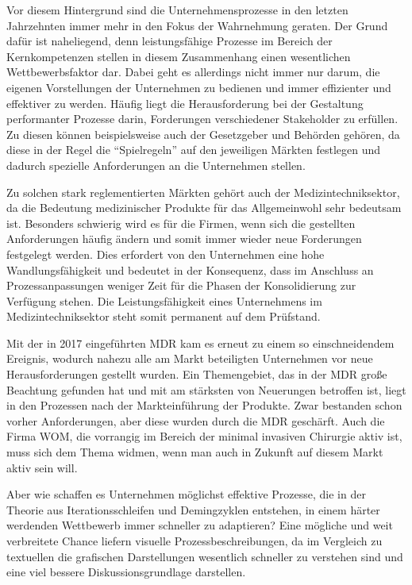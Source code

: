 \documentclass[a4paper,12pt]{report}
\begin{document}
Vor diesem Hintergrund sind die Unternehmensprozesse in den letzten Jahrzehnten immer mehr in den Fokus der Wahrnehmung geraten. Der Grund dafür ist naheliegend, denn leistungsfähige Prozesse im Bereich der Kernkompetenzen stellen in diesem Zusammenhang einen wesentlichen Wettbewerbsfaktor dar. Dabei geht es allerdings nicht immer nur darum, die eigenen Vorstellungen der Unternehmen zu bedienen und immer effizienter und effektiver zu werden. Häufig liegt die Herausforderung bei der Gestaltung performanter Prozesse darin, Forderungen verschiedener Stakeholder zu erfüllen. Zu diesen können beispielsweise auch der Gesetzgeber und Behörden gehören, da diese in der Regel die "`Spielregeln"' auf den jeweiligen Märkten festlegen und dadurch spezielle Anforderungen an die Unternehmen stellen.

Zu solchen stark reglementierten Märkten gehört auch der Medizintechniksektor, da die Bedeutung medizinischer Produkte für das Allgemeinwohl sehr bedeutsam ist. Besonders schwierig wird es für die Firmen, wenn sich die gestellten Anforderungen häufig ändern und somit immer wieder neue Forderungen festgelegt werden. Dies erfordert von den Unternehmen eine hohe Wandlungsfähigkeit und bedeutet in der Konsequenz, dass im Anschluss an Prozessanpassungen weniger Zeit für die Phasen der Konsolidierung zur Verfügung stehen. Die Leistungsfähigkeit eines Unternehmens im Medizintechniksektor steht somit permanent auf dem Prüfstand.

Mit der in 2017 eingeführten MDR kam es erneut zu einem so einschneidendem Ereignis, wodurch nahezu alle am Markt beteiligten Unternehmen vor neue Herausforderungen gestellt wurden. Ein Themengebiet, das in der MDR große Beachtung gefunden hat und mit am stärksten von Neuerungen betroffen ist, liegt in den Prozessen nach der Markteinführung der Produkte. Zwar bestanden schon vorher Anforderungen, aber diese wurden durch die MDR geschärft. Auch die Firma WOM, die vorrangig im Bereich der minimal invasiven Chirurgie aktiv ist, muss sich dem Thema widmen, wenn man auch in Zukunft auf diesem Markt aktiv sein will.

Aber wie schaffen es Unternehmen möglichst effektive Prozesse, die in der Theorie aus Iterationsschleifen und Demingzyklen entstehen, in einem härter werdenden Wettbewerb immer schneller zu adaptieren? Eine mögliche und weit verbreitete Chance liefern visuelle Prozessbeschreibungen, da im Vergleich zu textuellen die grafischen Darstellungen wesentlich schneller zu verstehen sind und eine viel bessere Diskussionsgrundlage darstellen.
\end{document}
